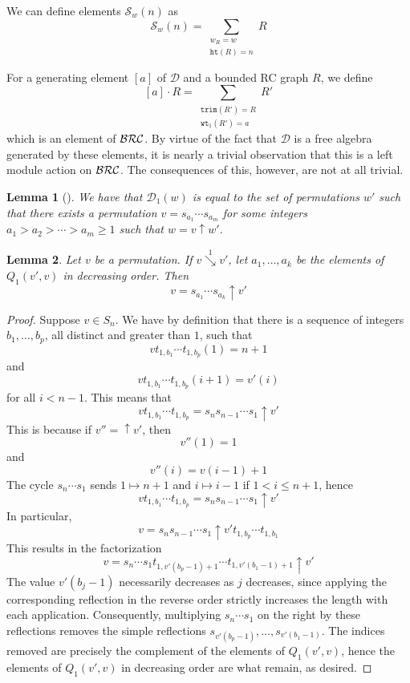 \documentclass{amsart}
\newtheorem{lemma}{Lemma}[subsection]
\theoremstyle{definition}
\theoremstyle{remark}
\numberwithin{equation}{subsection}
\newcommand{\shup}{{\uparrow}}
\newcommand{\downvar}[1]{\stackrel{#1}{\searrow}}
\newcommand{\wof}[1]{w_{#1}}
\newcommand{\wtt}{\mathtt{wt}}
\newcommand{\trm}{\mathtt{trim}}
\newcommand{\hr}{\mathtt{ht}}
\newcommand{\dcoma}{\mathcal{D}}
\begin{document}
We can define elements $\mathcal{S}_w(n)$ as
$$\mathcal{S}_w(n) = \sum_{\substack{\wof{R}=w\\\hr(R)=n}}R$$

For a generating element $[a]$ of $\dcoma$ and a bounded RC graph $R$, we define 
$$[a]\cdot R=\sum_{\substack{\trm(R') = R\\\wtt_1(R') = a}}R'$$
which is an element of $\mathcal{BRC}$. By virtue of the fact that $\dcoma$ is a free algebra generated by these elements, it is nearly a trivial observation that this is a left module action on $\mathcal{BRC}$. The consequences of this, however, are not at all trivial.

\begin{lemma}[{\cite[Corollary~3.11]{bbrc}}] \label{lemma:d1desc}
We have that $\mathcal{D}_1(w)$ is equal to the set of permutations $w'$ such that there exists a permutation $v=s_{a_1}\cdots s_{a_m}$ for some integers $a_1>a_2>\cdots>a_m\geq 1$ such that $w =v\shup{w'}$.
\end{lemma}


\begin{lemma}\label{lemma:factor}
Let $v$ be a permutation. If $v\downvar{1} v'$, let $a_1,\ldots, a_k$ be the elements of $Q_1(v',v)$ in decreasing order. Then
$$v=s_{a_1}\cdots s_{a_k}\shup{v'}$$
\end{lemma}
\begin{proof}
	Suppose $v\in S_{n}$. We have by definition that there is a sequence of integers $b_1,\ldots,b_p$, all distinct and greater than $1$, such that
	$$vt_{1,b_1}\cdots t_{1, b_p}(1) = n + 1$$
	and
	$$vt_{1,b_1}\cdots t_{1, b_p}(i+1) = v'(i)$$
	for all $i<n-1$. This means that
	$$vt_{1,b_1}\cdots t_{1, b_p} = s_ns_{n-1}\cdots s_1\shup{v'}$$
	This is because if $v''=\shup{v'}$, then
	$$v''(1)=1$$
	and
	$$v''(i) = v(i-1)+1$$
	The cycle $s_n\cdots s_1$ sends $1\mapsto n+1$ and $i\mapsto i-1$ if $1<i\leq n+1$, hence
	$$vt_{1,b_1}\cdots t_{1, b_p} = s_ns_{n-1}\cdots s_1\shup{v'}$$
	In particular,
	$$v = s_ns_{n-1}\cdots s_1\shup{v'}t_{1,b_p}\cdots t_{1, b_1}$$
	This results in the factorization
	$$v = s_n\cdots s_1t_{1,v'(b_p-1)+1}\cdots t_{1,v'(b_1-1)+1}\shup{v'}$$
	The value $v'(b_j-1)$ necessarily decreases as $j$ decreases, since applying the corresponding reflection in the reverse order strictly increases the length with each application.  Consequently, multiplying $s_n\cdots s_1$ on the right by these reflections removes the simple reflections $s_{v'(b_p-1)},\ldots, s_{v'(b_1-1)}$. The indices removed are precisely the complement of the elements of $Q_1(v',v)$, hence the elements of $Q_1(v',v)$ in decreasing order are what remain, as desired.
\end{proof}
\end{document}
